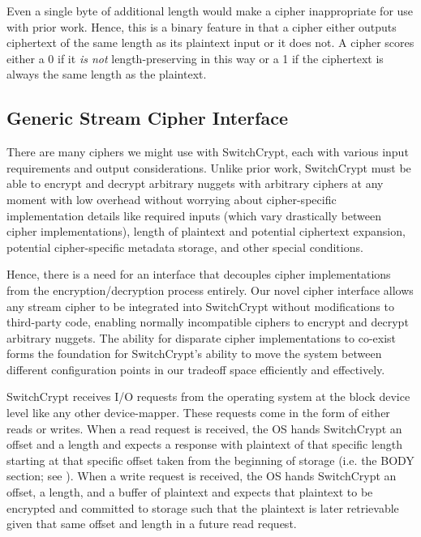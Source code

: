 Even a single byte of additional length would make a cipher inappropriate for
use with prior work. Hence, this is a binary feature in that a cipher either
outputs ciphertext of the same length as its plaintext input or it does not. A
cipher scores either a 0 if it \emph{is not} length-preserving in this way or a
1 if the ciphertext is always the same length as the plaintext. 

\subsection{Generic Stream Cipher Interface} \label{subsec:interface}

There are many ciphers we might use with SwitchCrypt, each with
various input requirements and output considerations. Unlike prior
work, SwitchCrypt must be able to encrypt and decrypt arbitrary
nuggets with arbitrary ciphers at any moment with low overhead without
worrying about cipher-specific implementation details like required
inputs (which vary drastically between cipher implementations), length
of plaintext and potential ciphertext expansion, potential
cipher-specific metadata storage, and other special conditions.

Hence, there is a need for an interface that decouples cipher implementations
from the encryption/decryption process entirely. Our novel cipher interface
allows any stream cipher to be integrated into SwitchCrypt without modifications
to third-party code, enabling normally incompatible ciphers to encrypt and
decrypt arbitrary nuggets. The ability for disparate cipher implementations to
co-exist forms the foundation for SwitchCrypt's ability to move the system
between different configuration points in our tradeoff space efficiently and
effectively.

SwitchCrypt receives I/O requests from the operating system at the block device
level like any other device-mapper. These requests come in the form of either
reads or writes. When a read request is received, the OS hands SwitchCrypt an
offset and a length and expects a response with plaintext of that specific
length starting at that specific offset taken from the beginning of storage
(i.e. the BODY section; see ). When a write request is
received, the OS hands SwitchCrypt an offset, a length, and a buffer of
plaintext and expects that plaintext to be encrypted and committed to storage
such that the plaintext is later retrievable given that same offset and length
in a future read request. 

